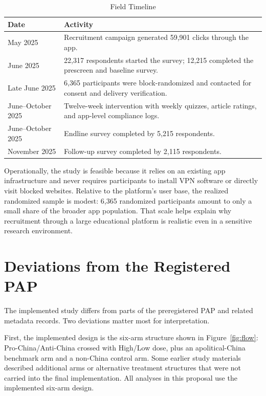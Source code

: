 \documentclass[12pt,american]{article}
\begin{document}
\begin{table}[H]
\centering
\caption{Field Timeline}
\label{tab:timeline}
\begin{tabularx}{\textwidth}{@{}L{0.34\textwidth}X@{}}
\toprule
Date & Activity \\
\midrule
May 2025 & Recruitment campaign generated 59,901 clicks through the app. \\
June 2025 & 22,317 respondents started the survey; 12,215 completed the prescreen and baseline survey. \\
Late June 2025 & 6,365 participants were block-randomized and contacted for consent and delivery verification. \\
June--October 2025 & Twelve-week intervention with weekly quizzes, article ratings, and app-level compliance logs. \\
June--October 2025 & Endline survey completed by 5,215 respondents. \\
November 2025 & Follow-up survey completed by 2,115 respondents. \\
\bottomrule
\end{tabularx}
\end{table}

Operationally, the study is feasible because it relies on an existing app infrastructure and never requires participants to install VPN software or directly visit blocked websites. Relative to the platform's user base, the realized randomized sample is modest: 6,365 randomized participants amount to only a small share of the broader app population. That scale helps explain why recruitment through a large educational platform is realistic even in a sensitive research environment.

\section{Deviations from the Registered PAP}

The implemented study differs from parts of the preregistered PAP and related metadata records. Two deviations matter most for interpretation.

First, the implemented design is the six-arm structure shown in Figure~\ref{fig:flow}: Pro-China/Anti-China crossed with High/Low dose, plus an apolitical-China benchmark arm and a non-China control arm. Some earlier study materials described additional arms or alternative treatment structures that were not carried into the final implementation. All analyses in this proposal use the implemented six-arm design.
\end{document}
